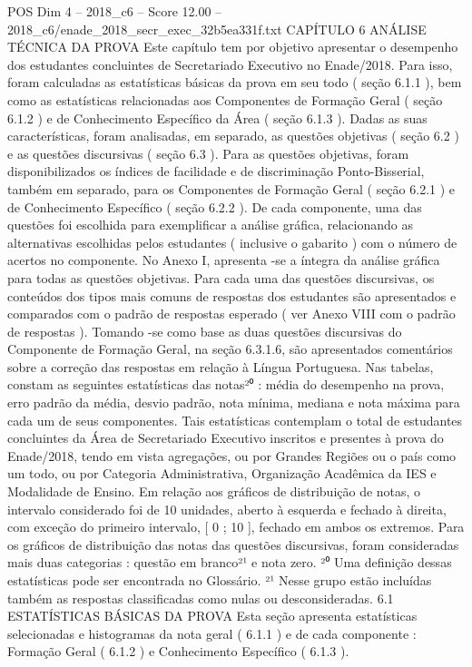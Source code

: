 \begin{textsample}{POS Dim 4 – 2018\_c6 – Score 12.00 – 2018\_c6/enade\_2018\_secr\_exec\_32b5ea331f.txt}  \label{ex:f4_pos_015}
CAPÍTULO 6 ANÁLISE TÉCNICA DA PROVA Este capítulo tem por objetivo apresentar o desempenho dos estudantes concluintes de Secretariado Executivo no Enade/2018.
Para isso, foram calculadas as estatísticas básicas da prova em seu todo ( seção 6.1.1 ), bem como as estatísticas relacionadas aos Componentes de Formação Geral ( seção 6.1.2 ) e de Conhecimento Específico da Área ( seção 6.1.3 ).
Dadas as suas características, foram analisadas, em separado, as questões objetivas ( seção 6.2 ) e as questões discursivas ( seção 6.3 ).
Para as questões objetivas, foram disponibilizados os índices de facilidade e de discriminação Ponto-Bisserial, também em separado, para os Componentes de Formação Geral ( seção 6.2.1 ) e de Conhecimento Específico ( seção 6.2.2 ).
De cada componente, uma das questões foi escolhida para exemplificar a análise gráfica, relacionando as alternativas escolhidas pelos estudantes ( inclusive o gabarito ) com o número de acertos no componente.
No Anexo I, apresenta -se a íntegra da análise gráfica para todas as questões objetivas.
Para cada uma das questões discursivas, os conteúdos dos tipos mais comuns de respostas dos estudantes são apresentados e comparados com o padrão de respostas esperado ( ver Anexo VIII com o padrão de respostas ).
Tomando -se como base as duas questões discursivas do Componente de Formação Geral, na seção 6.3.1.6, são apresentados comentários sobre a correção das respostas em relação à Língua Portuguesa.
Nas tabelas, constam as seguintes estatísticas das notas²⁰ : média do desempenho na prova, erro padrão da média, desvio padrão, nota mínima, mediana e nota máxima para cada um de seus componentes.
Tais estatísticas contemplam o total de estudantes concluintes da Área de Secretariado Executivo inscritos e presentes à prova do Enade/2018, tendo em vista agregações, ou por Grandes Regiões ou o país como um todo, ou por Categoria Administrativa, Organização Acadêmica da IES e Modalidade de Ensino.
Em relação aos gráficos de distribuição de notas, o intervalo considerado foi de 10 unidades, aberto à esquerda e fechado à direita, com exceção do primeiro intervalo, [ 0 ; 10 ], fechado em ambos os extremos.
Para os gráficos de distribuição das notas das questões discursivas, foram consideradas mais duas categorias : questão em branco²¹ e nota zero. ²⁰ Uma definição dessas estatísticas pode ser encontrada no Glossário. ²¹ Nesse grupo estão incluídas também as respostas classificadas como nulas ou desconsideradas. 6.1 ESTATÍSTICAS BÁSICAS DA PROVA Esta seção apresenta estatísticas selecionadas e histogramas da nota geral ( 6.1.1 ) e de cada componente : Formação Geral ( 6.1.2 ) e Conhecimento Específico ( 6.1.3 ).

\end{textsample}
